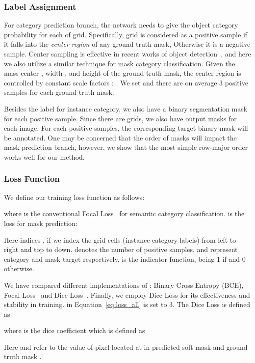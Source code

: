 \documentclass[runningheads]{llncs}
\begin{document}
\subsubsection{Label Assignment}
For category prediction branch, the network needs to give the object category probability for each of  grid. Specifically, grid  is considered as a positive sample if it falls into the \textit{center region} of any ground truth mask, Otherwise it is a negative sample. Center sampling is effective in recent works of object detection~\cite{fcos,foveabox}, and here we also utilize a similar technique for mask category classification. Given the mass center , width , and height  of the ground truth mask, the center region is controlled by constant scale factors : . We set  and there are on average 3 positive samples for each ground truth mask.

Besides the label for instance category, we also have a binary segmentation mask for each positive sample. Since there are  grids, we also have  output masks for each image. For each positive samples, the corresponding target binary mask will be annotated. One may be concerned that the order of masks will impact the mask prediction branch, however, we show that the most simple row-major order works well for our method.

\subsubsection{Loss Function}
We define our training loss function as follows:

where  is the conventional Focal Loss~\cite{focalloss} for semantic category classification.  is the loss for mask prediction:

Here indices ,
if we index the grid cells  (instance category labels) from left to right and top to down.
 denotes the number of positive samples,  and  represent category and mask target
respectively.
 is the indicator function, being 1 if  and 0 otherwise.



We have compared different implementations of : Binary Cross Entropy (BCE), Focal Loss~\cite{focalloss} and Dice Loss~\cite{vnet}. Finally, we employ Dice Loss for its effectiveness and stability in training.
 in Equation~\eqref{eq:loss_all} is set to 3.
The Dice Loss is defined as

where  is the dice coefficient which is defined as

Here  and  refer to the value of pixel located at  in
predicted soft mask  and ground truth mask .
\end{document}
